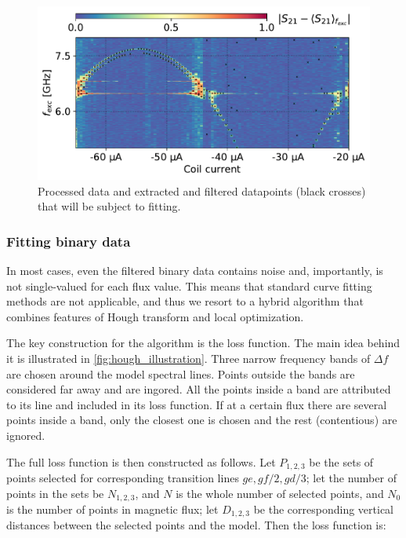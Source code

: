 \documentclass[%
 aip,
 amsmath,amssymb,
 reprint,%
]{revtex4-1}
\begin{document}
\begin{figure}
	\includegraphics[width=\linewidth]{extract_points}
	\caption{Processed data and extracted and filtered datapoints (black crosses) that will be subject to fitting.}
	\label{fig:extract_points}
\end{figure}

\subsubsection{Fitting binary data}

In most cases, even the filtered binary data contains noise and, importantly, is not single-valued for each flux value. This means that standard curve fitting methods are not applicable, and thus we resort to a hybrid algorithm that combines features of Hough transform\cite{hough1962} and local optimization.

The key construction for the algorithm is the loss function. The main idea behind it is illustrated in \autoref{fig:hough_illustration}. Three narrow frequency bands of $\Delta f$ are chosen around the model spectral lines. Points outside the bands are considered far away and are ingored. All the points inside a band are attributed to its line and included in its loss function. If at a certain flux there are several points inside a band, only the closest one is chosen and the rest (contentious) are ignored. 

The full loss function is then constructed as follows. Let $P_{1,2,3}$ be the sets of points selected for corresponding transition lines $ge, gf/2, gd/3$; let the number of points in the sets be $N_{1,2,3}$, and $N$ is the whole number of selected points, and $N_0$ is the number of points in magnetic flux; let $D_{1,2,3}$ be the corresponding vertical distances between the selected points and the model. Then the loss function is:
\end{document}
